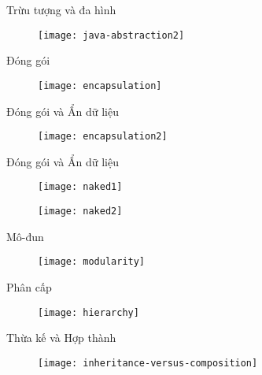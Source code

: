 \documentclass{beamer}
\begin{document}
\begin{frame}{Trừu tượng và đa hình}
    \begin{figure}
        \centering
        \texttt{[image: java-abstraction2]}
    \end{figure}
\end{frame}

\begin{frame}{Đóng gói}
    \begin{figure}
        \centering
        \texttt{[image: encapsulation]}
    \end{figure}
\end{frame}

\begin{frame}{Đóng gói và Ẩn dữ liệu}
    \begin{figure}
        \centering
        \texttt{[image: encapsulation2]}
    \end{figure}
\end{frame}

\begin{frame}{Đóng gói và Ẩn dữ liệu}
    \begin{figure}
        \centering
        \texttt{[image: naked1]}
    \end{figure}
    \begin{figure}
        \centering
        \texttt{[image: naked2]}
    \end{figure}
\end{frame}

\begin{frame}{Mô-đun}
    \begin{figure}
        \centering
        \texttt{[image: modularity]}
    \end{figure}
\end{frame}

\begin{frame}{Phân cấp}
    \begin{figure}
        \centering
        \texttt{[image: hierarchy]}
    \end{figure}
\end{frame}

\begin{frame}{Thừa kế và Hợp thành}
    \begin{figure}
        \centering
        \texttt{[image: inheritance-versus-composition]}
    \end{figure}
\end{frame}
\end{document}
